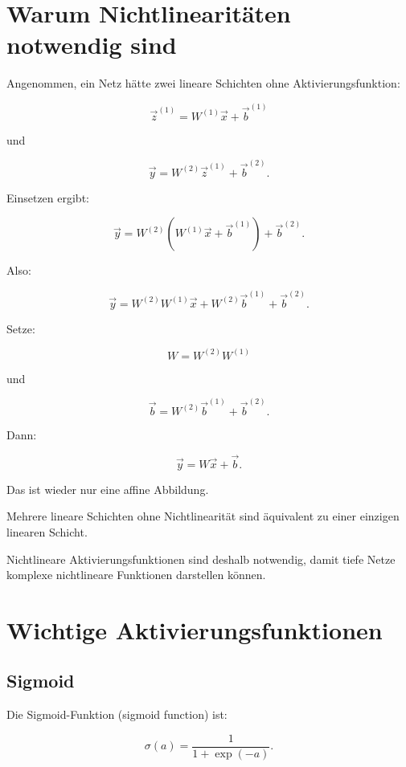 \section{Warum Nichtlinearitäten notwendig sind}

Angenommen, ein Netz hätte zwei lineare Schichten ohne Aktivierungsfunktion:

\[
    \vec{z}^{(1)}
    =
    W^{(1)}\vec{x}
    +
    \vec{b}^{(1)}
\]

und

\[
    \vec{y}
    =
    W^{(2)}\vec{z}^{(1)}
    +
    \vec{b}^{(2)}.
\]

Einsetzen ergibt:

\[
    \vec{y}
    =
    W^{(2)}
    \left(
        W^{(1)}\vec{x}
        +
        \vec{b}^{(1)}
    \right)
    +
    \vec{b}^{(2)}.
\]

Also:

\[
    \vec{y}
    =
    W^{(2)}W^{(1)}\vec{x}
    +
    W^{(2)}\vec{b}^{(1)}
    +
    \vec{b}^{(2)}.
\]

Setze:

\[
    W
    =
    W^{(2)}W^{(1)}
\]

und

\[
    \vec{b}
    =
    W^{(2)}\vec{b}^{(1)}
    +
    \vec{b}^{(2)}.
\]

Dann:

\[
    \vec{y}
    =
    W\vec{x}
    +
    \vec{b}.
\]

Das ist wieder nur eine affine Abbildung.

\begin{conceptbox}
Mehrere lineare Schichten ohne Nichtlinearität sind äquivalent zu einer einzigen linearen Schicht.

Nichtlineare Aktivierungsfunktionen sind deshalb notwendig, damit tiefe Netze komplexe nichtlineare Funktionen darstellen können.
\end{conceptbox}

\section{Wichtige Aktivierungsfunktionen}

\subsection{Sigmoid}

Die Sigmoid-Funktion (sigmoid function) ist:

\[
    \sigma(a)
    =
    \frac{1}{1+\exp(-a)}.
\]

